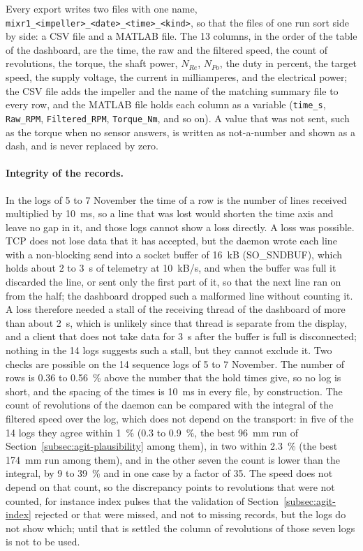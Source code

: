 Every export writes two files with one name, \texttt{mixr1\_<impeller>\_<date>\_<time>\_<kind>}, so that the files of one run sort side by side: a CSV file and a MATLAB file. The 13 columns, in the order of the table of the dashboard, are the time, the raw and the filtered speed, the count of revolutions, the torque, the shaft power, $N_{Re}$, $N_{Po}$, the duty in percent, the target speed, the supply voltage, the current in milliamperes, and the electrical power; the CSV file adds the impeller and the name of the matching summary file to every row, and the MATLAB file holds each column as a variable (\texttt{time\_s}, \texttt{Raw\_RPM}, \texttt{Filtered\_RPM}, \texttt{Torque\_Nm}, and so on). A value that was not sent, such as the torque when no sensor answers, is written as not-a-number and shown as a dash, and is never replaced by zero.

\paragraph{Integrity of the records.}
In the logs of 5 to 7 November the time of a row is the number of lines received multiplied by 10~ms, so a line that was lost would shorten the time axis and leave no gap in it, and those logs cannot show a loss directly. A loss was possible. TCP does not lose data that it has accepted, but the daemon wrote each line with a non-blocking send into a socket buffer of 16~kB (SO_SNDBUF), which holds about 2 to 3~s of telemetry at 10~kB/s, and when the buffer was full it discarded the line, or sent only the first part of it, so that the next line ran on from the half; the dashboard dropped such a malformed line without counting it. A loss therefore needed a stall of the receiving thread of the dashboard of more than about 2~s, which is unlikely since that thread is separate from the display, and a client that does not take data for 3~s after the buffer is full is disconnected; nothing in the 14 logs suggests such a stall, but they cannot exclude it. Two checks are possible on the 14 sequence logs of 5 to 7 November. The number of rows is 0.36 to 0.56~\% above the number that the hold times give, so no log is short, and the spacing of the times is 10~ms in every file, by construction. The count of revolutions of the daemon can be compared with the integral of the filtered speed over the log, which does not depend on the transport: in five of the 14 logs they agree within 1~\% (0.3 to 0.9~\%, the best 96~mm run of Section~\ref{subsec:agit-plausibility} among them), in two within 2.3~\% (the best 174~mm run among them), and in the other seven the count is lower than the integral, by 9 to 39~\% and in one case by a factor of 35. The speed does not depend on that count, so the discrepancy points to revolutions that were not counted, for instance index pulses that the validation of Section~\ref{subsec:agit-index} rejected or that were missed, and not to missing records, but the logs do not show which; until that is settled the column of revolutions of those seven logs is not to be used.

